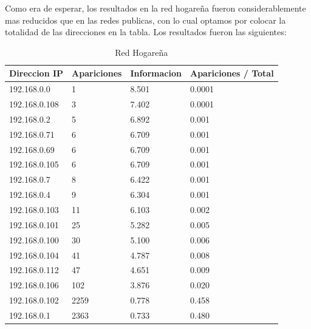 Como era de esperar, los resultados en la red hogareña fueron considerablemente mas reducidos que en las redes publicas, con lo cual optamos por colocar la totalidad de las direcciones en la tabla. Los resultados fueron las siguientes:

%

\begin{table}[H]
\centering
\caption{Red Hogareña}
\label{my-label}
\begin{tabular}{@{}llll@{}}
\toprule
Direccion IP  & Apariciones & Informacion & Apariciones / Total \\ \midrule
192.168.0.0   & 1           & 8.501       & 0.0001              \\
192.168.0.108 & 3           & 7.402       & 0.0001              \\
192.168.0.2   & 5           & 6.892       & 0.001               \\
192.168.0.71  & 6           & 6.709       & 0.001               \\
192.168.0.69  & 6           & 6.709       & 0.001               \\
192.168.0.105 & 6           & 6.709       & 0.001               \\
192.168.0.7   & 8           & 6.422       & 0.001               \\
192.168.0.4   & 9           & 6.304       & 0.001               \\
192.168.0.103 & 11          & 6.103       & 0.002               \\
192.168.0.101 & 25          & 5.282       & 0.005               \\
192.168.0.100 & 30          & 5.100       & 0.006               \\
192.168.0.104 & 41          & 4.787       & 0.008               \\
192.168.0.112 & 47          & 4.651       & 0.009               \\
192.168.0.106 & 102         & 3.876       & 0.020               \\
192.168.0.102 & 2259        & 0.778       & 0.458               \\
192.168.0.1   & 2363        & 0.733       & 0.480               \\ \bottomrule
\end{tabular}
\end{table}

